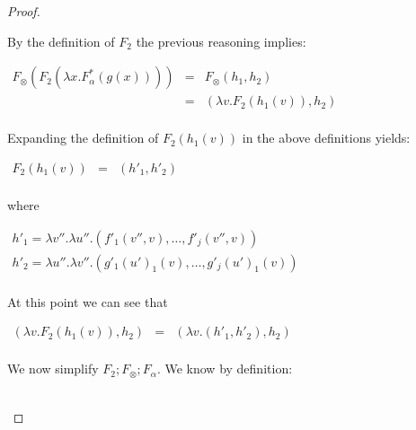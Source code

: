 \begin{proof}
\begin{report}
\begin{center}
\begin{itemize}
      By the definition of $F_2$ the previous reasoning implies:
      \begin{center}
        \begin{math}
          \begin{array}{lll}
            F_\otimes(F_2(\lambda x.F^*_\alpha(g(x))))
            & = & F_\otimes(h_1,h_2)\\
            & = & (\lambda v.F_2(h_1(v)),h_2)\\
          \end{array}
        \end{math}
      \end{center}
      Expanding the definition of $F_2(h_1(v))$ in the above definitions yields:
      \begin{center}
        \begin{math}
          \begin{array}{lll}
            F_2(h_1(v))
            & = & (h'_1,h'_2)\\
          \end{array}
        \end{math}
      \end{center}
      where
      \begin{center}
        \begin{math}
          \begin{array}{lll}
            h'_1 = \lambda v''.\lambda u''.(f'_1(v'',v),\ldots,f'_j(v'',v))\\
            h'_2 = \lambda u''.\lambda v''.(g'_1(u')_1(v),\ldots,g'_j(u')_1(v))\\
          \end{array}
        \end{math}
      \end{center}
      At this point we can see that
      \begin{center}
        \begin{math}
          \begin{array}{lll}
            (\lambda v.F_2(h_1(v)),h_2) & = & (\lambda v.(h'_1,h'_2),h_2)\\
          \end{array}
        \end{math}
      \end{center}
      We now simplify $F_2;F_\otimes;F_\alpha$.  We know by definition:
      \begin{center}
        \begin{math}
          \begin{array}{lll}

\end{array}
\end{math}
\end{center}
\end{itemize}
\end{center}
\end{report}
\end{proof}
